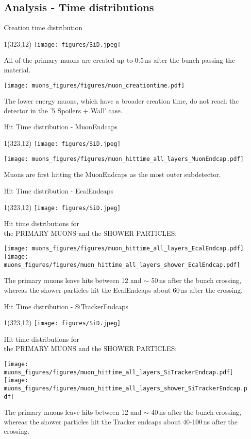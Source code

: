 \documentclass[xcolor={dvipsnames}]{beamer}
\newcommand{\sidlogo}{
  \setlength{\TPHorizModule}{1pt}
  \setlength{\TPVertModule}{1pt}
  \begin{textblock}{1}(323,12)
   \texttt{[image: figures/SiD.jpeg]}
  \end{textblock}
  }
\begin{document}
\subsection{Analysis - Time distributions}
\begin{frame}{Creation time distribution}
\sidlogo
All of the primary muons are created up to 0.5\,ns after the bunch passing the material.
 \begin{center}
\texttt{[image: muons\_figures/figures/muon\_creationtime.pdf]}
\end{center}
The lower energy muons, which have a broader creation time, do not reach the detector in the '5 Spoilers + Wall' case.
\end{frame}
\begin{frame}{Hit Time distribution - \small MuonEndcaps}
\sidlogo
 \begin{center}
\texttt{[image: muons\_figures/figures/muon\_hittime\_all\_layers\_MuonEndcap.pdf]}
\end{center}
Muons are first hitting the MuonEndcaps as the most outer subdetector.
\end{frame}
\begin{frame}{Hit Time distribution - \small EcalEndcaps}
\sidlogo
Hit time distributions for \\
\hspace*{0.6cm} the PRIMARY MUONS and the SHOWER PARTICLES:
 \begin{center}
\texttt{[image: muons\_figures/figures/muon\_hittime\_all\_layers\_EcalEndcap.pdf]}
\texttt{[image: muons\_figures/figures/muon\_hittime\_all\_layers\_shower\_EcalEndcap.pdf]}
\end{center}
The primary muons leave hits between 12 and $\sim$ 50\,ns after the bunch crossing, whereas the shower particles hit the EcalEndcaps about 60\,ns after the crossing.
\end{frame}
\begin{frame}{Hit Time distribution - \small SiTrackerEndcaps}
\sidlogo
Hit time distributions for \\
\hspace*{0.6cm} the PRIMARY MUONS and the SHOWER PARTICLES:
 \begin{center}
\texttt{[image: muons\_figures/figures/muon\_hittime\_all\_layers\_SiTrackerEndcap.pdf]}
\texttt{[image: muons\_figures/figures/muon\_hittime\_all\_layers\_shower\_SiTrackerEndcap.pdf]}
\end{center}
The primary muons leave hits between 12 and $\sim$ 40\,ns after the bunch crossing, whereas the shower particles hit the Tracker endcaps about 40-100\,ns after the crossing.
\end{frame}
\end{document}
